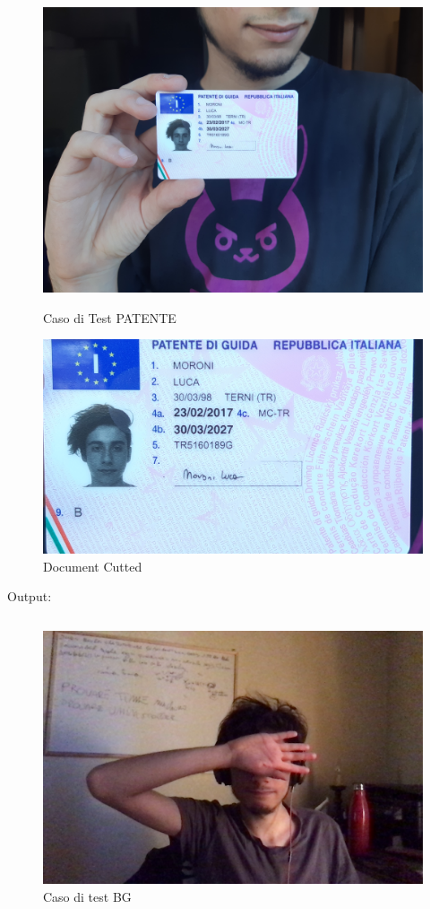 \documentclass[12pt,a4paper]{article}
\begin{document}
\begin{figure}[!htb]
   \begin{minipage}{0.48\textwidth}
     \centering
     \includegraphics[width=.7\linewidth]{test_patente.jpg}
     \caption{Caso di Test PATENTE}\label{Fig:}
   \end{minipage}\hfill
   \begin{minipage}{0.48\textwidth}
     \centering
     \includegraphics[width=.7\linewidth]{test_patente_cutting.jpg}
     \caption{Document Cutted}\label{Fig:}
   \end{minipage}
\end{figure}

Output:
\inputminted{python}{test_patente.py}

\begin{figure}[H]
    \caption{Caso di test BG}
    \centering
    \includegraphics[width=\textwidth,height=\textheight,keepaspectratio]{test_background.jpg}
\end{figure}
\end{document}

